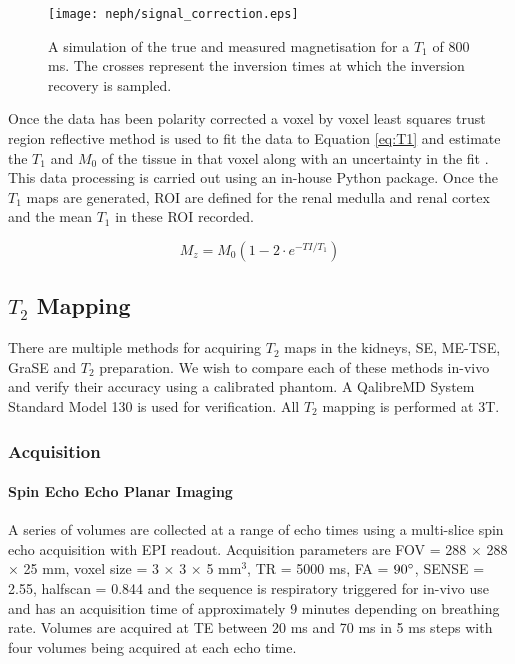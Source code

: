 \begin{figure}[H]
	\centering
	\texttt{[image: neph/signal\_correction.eps]}
	\caption{A simulation of the true and measured magnetisation for a $T_1$ of 800 ms. The crosses represent the inversion times at which the inversion recovery is sampled.}
	\label{fig:sig_correction}	
\end{figure}

Once the data has been polarity corrected a voxel by voxel least squares trust region reflective  method is used to fit the data to Equation \eqref{eq:T1} and estimate the $T_1$ and $M_0$ of the tissue in that voxel along with an uncertainty in the fit \cite{branch_subspace_1999}. This data processing is carried out using an in-house Python package. Once the $T_1$ maps are generated, \ac{ROI} are defined for the renal medulla and renal cortex and the mean $T_1$ in these \ac{ROI} recorded.

\begin{equation}
M_z = M_0 \left(1-2\cdot e^{-TI/T_1}\right)
\label{eq:T1}
\end{equation}

\subsection{$T_2$ Mapping}
\label{subsec:neph_t2_mapping}
There are multiple methods for acquiring $T_2$ maps in the kidneys, \ac{SE}, \ac{ME-TSE}, \ac{GraSE} and $T_2$ preparation. We wish to compare each of these methods in-vivo and verify their accuracy using a calibrated phantom. A QalibreMD System Standard Model 130 \cite{noauthor_system_nodate} is used for verification. All $T_2$ mapping is performed at 3T. 
\subsubsection{Acquisition}

\paragraph{Spin Echo Echo Planar Imaging}

A series of volumes are collected at a range of echo times using a multi-slice spin echo acquisition with \ac{EPI} readout. Acquisition parameters are \ac{FOV} = 288 $\times$ 288 $\times$ 25 mm, voxel size = 3 $\times$ 3 $\times$ 5 mm$^3$, \ac{TR} = 5000 ms, \ac{FA} = $90\degree$, \ac{SENSE} = 2.55, halfscan = 0.844 and the sequence is respiratory triggered for in-vivo use and has an acquisition time of approximately 9 minutes depending on breathing rate. Volumes are acquired at \ac{TE} between 20 ms and 70 ms in 5 ms steps with four volumes being acquired at each echo time. 

